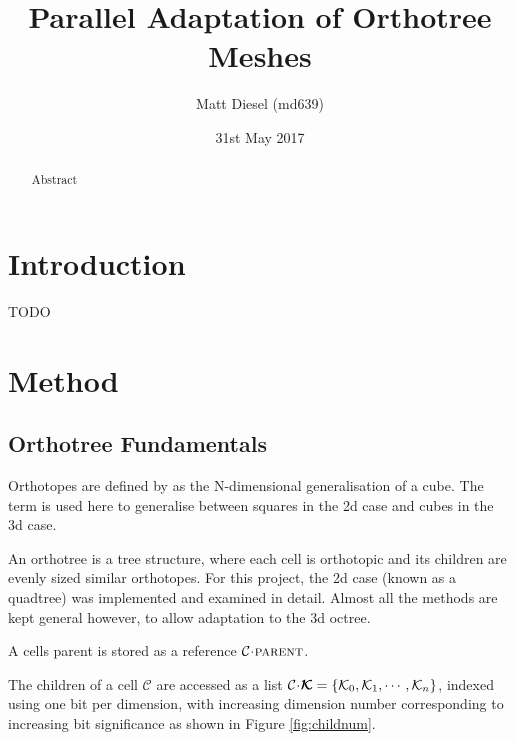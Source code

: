 \documentclass{IIBproject}
\newcommand{\vect} [1] {\bm{#1}}
\newcommand{\acc}{{\mkern 0.5mu\cdot\mkern 0.5mu}}
\numberwithin{figure}{section}
\begin{document}
\date{31st May 2017}
\author{Matt Diesel (md639)}
\title{Parallel Adaptation of Orthotree Meshes}

\pagestyle{empty}
\maketitle

\thispagestyle{empty}
\begin{abstract}
Abstract
\end{abstract}

\tableofcontents
\newpage
\pagestyle{plain}


\section{Introduction} %
    \label{sec:intro}

    TODO


\section{Method} %
    \label{sec:method}

    \subsection{Orthotree Fundamentals} %
        \label{sec:orthotree}

        Orthotopes are defined by \cite{coxeter73} as the N-dimensional generalisation of a cube. The term is used here to generalise between squares in the 2d case and cubes in the 3d case.

        An orthotree is a tree structure, where each cell is orthotopic and its children are evenly sized similar orthotopes. For this project, the 2d case (known as a quadtree) was implemented and examined in detail. Almost all the methods are kept general however, to allow adaptation to the 3d octree. 

        A cells parent is stored as a reference $\mathcal{C}\acc\textproc{parent}$.

        The children of a cell $\mathcal{C}$ are accessed as a list $\mathcal{C}\acc\vect{\mathcal{K}}=\{\mathcal{K}_0,\mathcal{K}_1,\cdots,\mathcal{K}_n\}$, indexed using one bit per dimension, with increasing dimension number corresponding to increasing bit significance as shown in Figure \ref{fig:childnum}.
\end{document}

